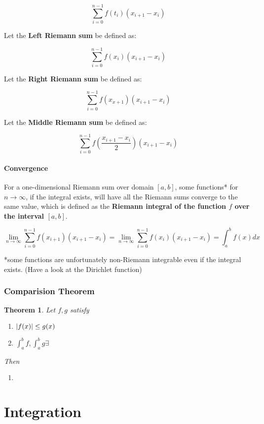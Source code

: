 \documentclass{book}
\newtheorem{theorem}{Theorem}[section]
\DeclarePairedDelimiter\abs{\lvert}{\rvert}%
\begin{document}
$$\sum_{i=0}^{n-1}f(t_i)(x_{i+1}-x_i)$$

Let the \textbf{Left Riemann sum} be defined as:

$$\sum_{i=0}^{n-1}f(x_i)(x_{i+1}-x_i)$$

Let the \textbf{Right Riemann sum} be defined as:

$$\sum_{i=0}^{n-1}f(x_{x+1})(x_{i+1}-x_i)$$

Let the \textbf{Middle Riemann sum} be defined as:

$$\sum_{i=0}^{n-1}f \left( \frac{x_{i+1}-x_i}{2} \right) (x_{i+1}-x_i)$$

\subsubsection*{Convergence}

For a one-dimensional Riemann sum over domain $[a,b]$, some functions* for \\ $n\to \infty$, if the integral exists, will have all the Riemann sums converge to the same value, which is defined as the \textbf{Riemann integral of the function $f$ over the interval $[a,b]$}.

$$\lim_{n\to \infty}\sum_{i=0}^{n-1}f(x_{i+1})(x_{i+1}-x_i)=\lim_{n\to \infty}\sum_{i=0}^{n-1}f(x_i)(x_{i+1}-x_i)=\int_a^bf(x)dx$$

*some functions are unfortunately non-Riemann integrable even if the integral exists. (Have a look at the Dirichlet function)

\subsection{Comparision Theorem}
\begin{theorem}
Let $f,g$ satisfy
\begin{enumerate}
    \item $\abs{f(x)} \leq g(x) $
    \item $\displaystyle\int_{a} ^{b} f , \displaystyle\int_{a} ^{b} g \exists$\\
\end{enumerate}
Then
\begin{enumerate}
    \item 
\end{enumerate}
\end{theorem}

\chapter{Integration}
\end{document}
